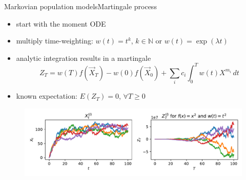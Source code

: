 \documentclass[9pt]{beamer}
\newcommand{\expSym}{{E}}
\newcommand{\E}[1]{\ensuremath{\expSym\left(#1\right)}}
\begin{document}
\begin{frame}{Markovian population models}{Martingale process}
    \begin{itemize}
        \item start with the moment ODE
    \item multiply time-weighting: $w(t)=t^k$, $k\in\mathbb{N}$ or $w(t)=\exp(\lambda t)$
    \item analytic integration results in a martingale 
        \begin{equation*}
            Z_T=w(T)f(\vec X_T) - w(0)f(\vec X_{0}) +
            \sum_ic_i\int_{0}^T w(t)X^{m_i}\,dt
        \end{equation*}
    \item known expectation: $\E{Z_T}=0$, $\forall T\geq 0$
  \end{itemize}
    \begin{example}
    \vspace{-1em}
    \begin{figure}
        \includegraphics[scale=.5]{../gfx/martingales.pdf}
    \end{figure}
    \vspace{-1em}
    \end{example}
\end{frame}
\end{document}
